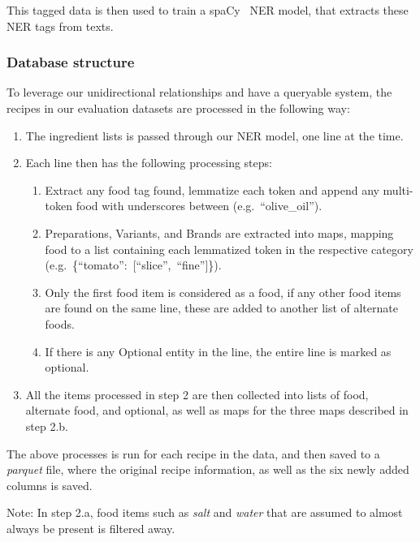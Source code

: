 \documentclass[11pt]{article}
\begin{document}
This tagged data is then used to train a spaCy~\cite{spacy} NER model, that
extracts these NER tags from texts.

\subsubsection{Database structure}\label{sec:dbStructure}
To leverage our unidirectional relationships and have a queryable system, the
recipes in our evaluation datasets are processed in the following way:
\begin{enumerate}
    \item The ingredient lists is passed through our NER model, one line at the
        time.
    \item Each line then has the following processing steps:
        \begin{enumerate}
            \item Extract any food tag found, lemmatize each token and append
                any multi-token food with underscores between (e.g.\
                ``olive\_oil'').
            \item Preparations, Variants, and Brands are extracted into maps,
                mapping food to a list containing each lemmatized token in the
                respective category \\(e.g.\ \{``tomato'':\ [``slice'',\
                ``fine'']\}).
            \item Only the first food item is considered as a food, if any other
                food items are found on the same line, these are added to
                another list of alternate foods.
            \item If there is any Optional entity in the line, the entire line
                is marked as optional.
        \end{enumerate}
    \item All the items processed in step 2 are then collected into lists of food, 
        alternate food, and optional, as well as maps for the three maps described in
        step 2.b.
\end{enumerate}
The above processes is run for each recipe in the data, and then saved to a
\emph{parquet} file, where the original recipe information, as well as the six newly
added columns is saved.

Note: In step 2.a, food items such as \emph{salt} and \emph{water} that are
assumed to almost always be present is filtered away.
\end{document}
